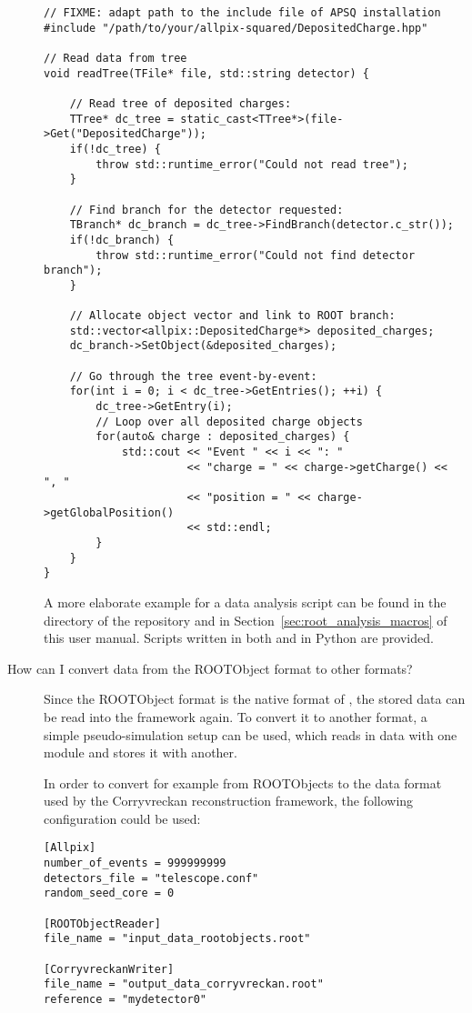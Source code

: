 \begin{description}
\begin{verbatim}
// FIXME: adapt path to the include file of APSQ installation
#include "/path/to/your/allpix-squared/DepositedCharge.hpp"

// Read data from tree
void readTree(TFile* file, std::string detector) {

    // Read tree of deposited charges:
    TTree* dc_tree = static_cast<TTree*>(file->Get("DepositedCharge"));
    if(!dc_tree) {
        throw std::runtime_error("Could not read tree");
    }

    // Find branch for the detector requested:
    TBranch* dc_branch = dc_tree->FindBranch(detector.c_str());
    if(!dc_branch) {
        throw std::runtime_error("Could not find detector branch");
    }

    // Allocate object vector and link to ROOT branch:
    std::vector<allpix::DepositedCharge*> deposited_charges;
    dc_branch->SetObject(&deposited_charges);

    // Go through the tree event-by-event:
    for(int i = 0; i < dc_tree->GetEntries(); ++i) {
        dc_tree->GetEntry(i);
        // Loop over all deposited charge objects
        for(auto& charge : deposited_charges) {
            std::cout << "Event " << i << ": "
                      << "charge = " << charge->getCharge() << ", "
                      << "position = " << charge->getGlobalPosition()
                      << std::endl;
        }
    }
}

\end{verbatim}
A more elaborate example for a data analysis script can be found in the  directory of the repository and in Section~\ref{sec:root_analysis_macros} of this user manual.
Scripts written in both \CPP and in Python are provided.

\item[How can I convert data from the ROOTObject format to other formats?]
Since the ROOTObject format is the native format of \apsq, the stored data can be read into the framework again.
To convert it to another format, a simple pseudo-simulation setup can be used, which reads in data with one module and stores it with another.

In order to convert for example from ROOTObjects to the data format used by the Corryvreckan reconstruction framework, the following configuration could be used:
\begin{verbatim}
[Allpix]
number_of_events = 999999999
detectors_file = "telescope.conf"
random_seed_core = 0

[ROOTObjectReader]
file_name = "input_data_rootobjects.root"

[CorryvreckanWriter]
file_name = "output_data_corryvreckan.root"
reference = "mydetector0"
\end{verbatim}
\end{description}

